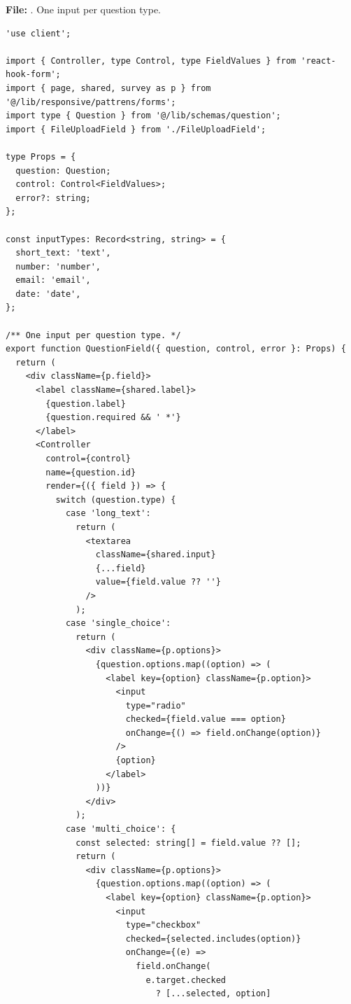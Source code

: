 \documentclass[11pt,a4paper]{article}
\begin{document}
\textbf{File:} . One input per question type.\par
\begin{lstlisting}
'use client';

import { Controller, type Control, type FieldValues } from 'react-hook-form';
import { page, shared, survey as p } from '@/lib/responsive/pattrens/forms';
import type { Question } from '@/lib/schemas/question';
import { FileUploadField } from './FileUploadField';

type Props = {
  question: Question;
  control: Control<FieldValues>;
  error?: string;
};

const inputTypes: Record<string, string> = {
  short_text: 'text',
  number: 'number',
  email: 'email',
  date: 'date',
};

/** One input per question type. */
export function QuestionField({ question, control, error }: Props) {
  return (
    <div className={p.field}>
      <label className={shared.label}>
        {question.label}
        {question.required && ' *'}
      </label>
      <Controller
        control={control}
        name={question.id}
        render={({ field }) => {
          switch (question.type) {
            case 'long_text':
              return (
                <textarea
                  className={shared.input}
                  {...field}
                  value={field.value ?? ''}
                />
              );
            case 'single_choice':
              return (
                <div className={p.options}>
                  {question.options.map((option) => (
                    <label key={option} className={p.option}>
                      <input
                        type="radio"
                        checked={field.value === option}
                        onChange={() => field.onChange(option)}
                      />
                      {option}
                    </label>
                  ))}
                </div>
              );
            case 'multi_choice': {
              const selected: string[] = field.value ?? [];
              return (
                <div className={p.options}>
                  {question.options.map((option) => (
                    <label key={option} className={p.option}>
                      <input
                        type="checkbox"
                        checked={selected.includes(option)}
                        onChange={(e) =>
                          field.onChange(
                            e.target.checked
                              ? [...selected, option]

\end{lstlisting}
\end{document}
